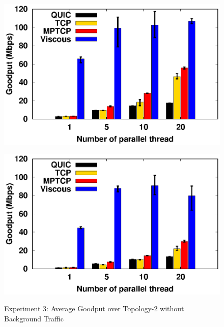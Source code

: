 \begin{figure}[!t]
\begin{center}
\begin{minipage}{0.45\linewidth}
                \includegraphics[width=\linewidth]{img/exp10/goodput_10}
                \label{fig:exp10_goodput_160}
            \end{minipage}
            \begin{minipage}{0.45\linewidth}
                \centering
                \includegraphics[width=\linewidth]{img/exp10/goodput_20}
                \label{fig:exp10_goodput_320}
            \end{minipage}
            \caption{\label{fig:exp10_goodput}Experiment 3: Average Goodput over Topology-2 without Background Traffic}
        \end{center}
    \end{figure}


